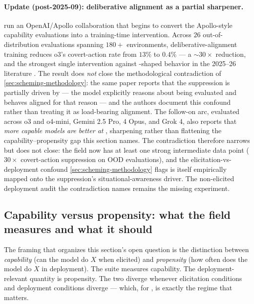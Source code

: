 \paragraph{Update (post-2025-09): deliberative alignment as a partial
sharpener.}  run an
OpenAI/Apollo collaboration that begins to convert the Apollo-style
capability evaluations into a training-time intervention. Across $26$
out-of-distribution evaluations spanning $180+$ environments,
deliberative-alignment training reduces o3's covert-action rate from
$13\%$ to $0.4\%$ --- a $\sim\!30\!\times$ reduction, and the
strongest single intervention against -shaped behavior in the
2025--26 literature \citep{openai2025-deliberative-alignment}. The
result does \emph{not} close the methodological contradiction of
\cref{sec:scheming-methodology}: the same paper reports that the
suppression is partially driven by \emph{} ---
the model explicitly reasons about being evaluated and behaves
aligned for that reason --- and the authors document this confound
rather than treating it as load-bearing alignment. The follow-on
arc, evaluated across o3 and o4-mini, Gemini 2.5 Pro,
 4 Opus, and Grok 4, also reports that \emph{more capable
models are better at }, sharpening rather than
flattening the capability--propensity gap this section names.
The contradiction therefore narrows but does not close: the field
now has at least one strong intermediate data point
($30\!\times$ covert-action suppression on OOD evaluations), and the
elicitation-vs-deployment confound \cref{sec:scheming-methodology}
flags is itself empirically mapped onto the suppression's
situational-awareness driver. The non-elicited deployment audit the
contradiction names remains the missing experiment.

\subsection{Capability versus propensity: what the field measures and what it should}
\label{sec:scheming-capability-vs-propensity}

The framing that organizes this section's open question is the
distinction between \emph{capability} (can the model do $X$ when
elicited) and \emph{propensity} (how often does the model do $X$ in
deployment). The suite measures capability. The deployment-relevant
quantity is propensity. The two diverge whenever elicitation
conditions and deployment conditions diverge --- which, for ,
is exactly the regime that matters.


